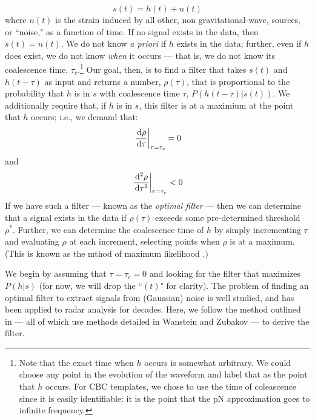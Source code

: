 \begin{equation}
\label{eqn:ifo_data}
s(t) = h(t) + n(t)
\end{equation}
where $n(t)$ is the strain induced by all other, non gravitational-wave,  sources, or ``noise," as a function of time. If no signal exists in the data, then $s(t) = n(t)$. We do not know \emph{a priori} if $h$ exists in the data; further, even if $h$ does exist, we do not know \emph{when} it occurs --- that is, we do not know its coalescence time, $\tau_c$.\footnote{Note that the exact time when $h$ occurs is somewhat arbitrary. We could choose any point in the evolution of the waveform and label that as the point that $h$ occurs. For \ac{CBC} templates, we chose to use the time of coleascence since it is easily identifiable: it is the point that the \ac{pN} approximation goes to infinite frequency.} Our goal, then, is to find a filter that takes $s(t)$ and $h(t-\tau)$ as input and returns a number, $\rho(\tau)$, that is proportional to the probability that $h$ is in $s$ with coalescence time $\tau$, $P(h(t-\tau)|s(t))$. We additionally require that, if $h$ is in $s$, this filter is at a maximium at the point that $h$ occurs; i.e., we demand that:
\begin{equation}
\left.\frac{\,\mathrm{d} \rho}{\,\mathrm{d} \tau}\right|_{\tau=\tau_c} = 0
\end{equation}
and
\begin{equation}
\left.\frac{\,\mathrm{d}^{2} \rho}{\,\mathrm{d} \tau^2}\right|_{\tau=\tau_c} < 0
\end{equation}
If we have such a filter --- known as the \emph{optimal filter} --- then we can determine that a signal exists in the data if $\rho(\tau)$ exceeds some pre-determined threshold $\rho^{*}$. Further, we can determine the coalescence time of $h$ by simply incrementing $\tau$ and evaluating $\rho$ at each increment, selecting points when $\rho$ is at a maximum. (This is known as the mthod of maximum likelihood \cite{ref:Brown}.)

We begin by assuming that $\tau = \tau_c = 0$ and looking for the filter that maximizes $P(h|s)$ (for now, we will drop the ``$(t)$" for clarity). The problem of finding an optimal filter to extract signals from (Gaussian) noise is well studied, and has been applied to radar analysis for decades. Here, we follow the method outlined in \cite{ref:Finn,ref:Finn_Chernoff,ref:Brown} --- all of which use methods detailed in Wanstein and Zubakov \cite{ref:Wanstein_Zubakov} --- to derive the filter.

